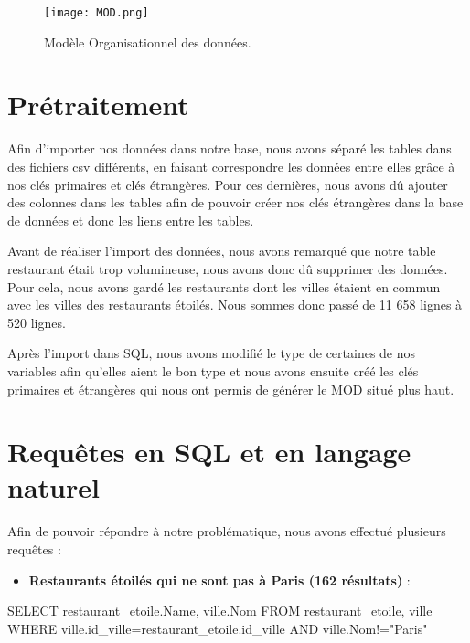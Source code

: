 \documentclass[mstat,12pt]{unswthesis}
\newenvironment{Shaded}{\begin{snugshade}}{\end{snugshade}}
\newcommand{\NormalTok}[1]{#1}
\newcommand{\OtherTok}[1]{\textcolor[rgb]{0.56,0.35,0.01}{#1}}
\newcommand{\SpecialCharTok}[1]{\textcolor[rgb]{0.00,0.00,0.00}{#1}}
\newcommand{\StringTok}[1]{\textcolor[rgb]{0.31,0.60,0.02}{#1}}
\begin{document}
\begin{figure}
\hypertarget{mod}{%
\centering
\texttt{[image: MOD.png]}
\caption{Modèle Organisationnel des données.}\label{mod}
}
\end{figure}

\bigskip

\hypertarget{pruxe9traitement}{%
\chapter{Prétraitement}\label{pruxe9traitement}}

Afin d'importer nos données dans notre base, nous avons séparé les
tables dans des fichiers csv différents, en faisant correspondre les
données entre elles grâce à nos clés primaires et clés étrangères. Pour
ces dernières, nous avons dû ajouter des colonnes dans les tables afin
de pouvoir créer nos clés étrangères dans la base de données et donc les
liens entre les tables.

\medskip

Avant de réaliser l'import des données, nous avons remarqué que notre
table restaurant était trop volumineuse, nous avons donc dû supprimer
des données. Pour cela, nous avons gardé les restaurants dont les villes
étaient en commun avec les villes des restaurants étoilés. Nous sommes
donc passé de 11 658 lignes à 520 lignes.

\medskip

Après l'import dans SQL, nous avons modifié le type de certaines de nos
variables afin qu'elles aient le bon type et nous avons ensuite créé les
clés primaires et étrangères qui nous ont permis de générer le MOD situé
plus haut.

\hypertarget{requuxeates-en-sql-et-en-langage-naturel}{%
\chapter{Requêtes en SQL et en langage
naturel}\label{requuxeates-en-sql-et-en-langage-naturel}}

Afin de pouvoir répondre à notre problématique, nous avons effectué
plusieurs requêtes :

\begin{itemize}
\tightlist
\item
  \textbf{Restaurants étoilés qui ne sont pas à Paris (162 résultats)} :
\end{itemize}

\begin{Shaded}
\begin{Highlighting}[]
\NormalTok{SELECT restaurant\_etoile.Name, ville.Nom}
\NormalTok{FROM restaurant\_etoile, ville}
\NormalTok{WHERE ville.id\_ville}\OtherTok{=}\NormalTok{restaurant\_etoile.id\_ville}
\NormalTok{AND ville.Nom}\SpecialCharTok{!=}\StringTok{"Paris"}
\end{Highlighting}
\end{Shaded}
\end{document}
